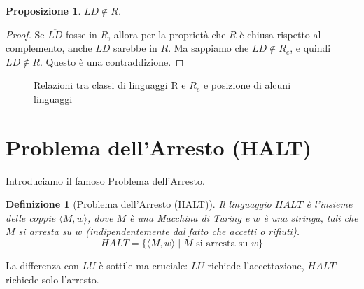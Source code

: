 \documentclass[a4paper, 11pt]{book} %
\newtheorem{definition}[theorem]{Definizione}
\newtheorem{proposition}[theorem]{Proposizione}
\theoremstyle{definition}
\begin{document}
\begin{proposition}
$\overline{LD} \notin R$.
\end{proposition}
\begin{proof}
Se $\overline{LD}$ fosse in $R$, allora per la proprietà che $R$ è chiusa rispetto al complemento, anche $LD$ sarebbe in $R$. Ma sappiamo che $LD \notin R_e$, e quindi $LD \notin R$. Questo è una contraddizione.
\end{proof}

\begin{figure}[h!]
    \centering
    \caption{Relazioni tra classi di linguaggi R e $R_e$ e posizione di alcuni linguaggi}
    \label{fig:r_re_map}
\end{figure}

\section{Problema dell'Arresto (HALT)}
Introduciamo il famoso Problema dell'Arresto.
\begin{definition}[Problema dell'Arresto (HALT)]
Il linguaggio $HALT$ è l'insieme delle coppie $\langle M, w \rangle$, dove $M$ è una Macchina di Turing e $w$ è una stringa, tali che $M$ si arresta su $w$ (indipendentemente dal fatto che accetti o rifiuti).
\[ HALT = \{ \langle M, w \rangle \mid M \text{ si arresta su } w \} \]
\end{definition}
La differenza con $LU$ è sottile ma cruciale: $LU$ richiede l'accettazione, $HALT$ richiede solo l'arresto.
\end{document}
